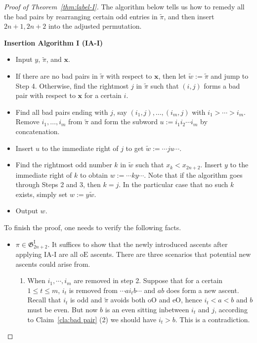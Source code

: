\documentclass[11pt,reqno]{amsart}
\numberwithin{equation}{section}
\theoremstyle{plain}
\theoremstyle{definition}
\newcommand{\bx}{\mathbf{x}}
\newcommand{\fG}{\mathfrak{G}}
\newcommand{\GI}{\fG^{\mathrm{I}}}
\def\oO{\mathrm{oO}}
\def\oE{\mathrm{oE}}
\def\eO{\mathrm{eO}}
\begin{document}
\begin{proof}[Proof of Theorem~\ref{thm:label-I}]
 	The algorithm below tells us how to remedy all the bad pairs by rearranging certain odd entries in $\tilde{\pi}$, and then insert $2n+1,2n+2$ into the adjusted permutation. 
 	\begin{framed}
 		\begin{center}
 			{\bf Insertion Algorithm I (IA-I)}
 		\end{center}
 		\begin{itemize}
 			\item[Initiate] Input $y$, $\tilde{\pi}$, and $\bx$.
 			\item[Step 1] If there are no bad pairs in $\tilde{\pi}$ with respect to $\bx$, then let $\tilde{w}:=\tilde{\pi}$ and jump to Step 4. Otherwise, find the rightmost $j$ in $\tilde{\pi}$ such that $(i,j)$ forms a bad pair with respect to $\bx$ for a certain $i$.
 			\item[Step 2] Find all bad pairs ending with $j$, say $(i_1,j),\ldots,(i_m,j)$ with $i_1>\cdots>i_m$. Remove $i_1,\ldots,i_m$ from $\tilde{\pi}$ and form the subword $u:=i_1 i_2 \cdots i_m$ by concatenation.
 			\item[Step 3] Insert $u$ to the immediate right of $j$ to get $\tilde{w}:=\cdots ju\cdots$.
 			\item[Step 4] Find the rightmost odd number $k$ in $\tilde{w}$ such that $x_k<x_{2n+2}$. Insert $y$ to the immediate right of $k$ to obtain $w:=\cdots ky\cdots$. Note that if the algorithm goes through Steps 2 and 3, then $k=j$. In the particular case that no such $k$ exists, simply set $w:=y\tilde{w}$.
 			\item[End] Output $w$.
 		\end{itemize}
 	\end{framed}
 	To finish the proof, one needs to verify the following facts.
 	\begin{itemize}
 		\item $\pi\in\GI_{2n+2}$. It suffices to show that the newly introduced ascents after applying IA-I are all $\oE$ ascents. There are three scenarios that potential new ascents could arise from.
 		\begin{enumerate}
 			\item When $i_1,\cdots,i_m$ are removed in step 2. Suppose that for a certain $1\le t\le m$, $i_t$ is removed from $\cdots ai_tb\cdots$ and $ab$ does form a new ascent. Recall that $i_t$ is odd and $\tilde{\pi}$ avoids both $\oO$ and $\eO$, hence $i_t<a<b$ and $b$ must be even. But now $b$ is an even sitting inbetween $i_t$ and $j$, according to Claim~\ref{cla:bad pair} (2) we should have $i_t>b$. This is a contradiction.
 			

\end{enumerate}
\end{itemize}
\end{proof}
\end{document}
